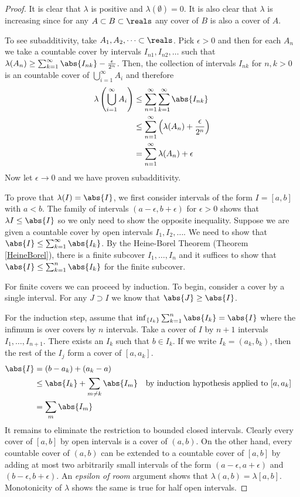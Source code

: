 \begin{proof}It is clear that $\lambda$ is positive and $\lambda(\emptyset) = 0$.  It is also
  clear that $\lambda$ is increasing since for any $A \subset B
  \subset \reals$ any cover of $B$ is also a cover of $A$.  

To see subadditivity, take $A_1, A_2, \dots \subset \reals$.  Pick
$\epsilon > 0$ and then for each $A_n$ we take a countable cover by intervals
$I_{n1}, I_{n2}, \dots$ such that $\lambda(A_n) \geq \sum_{k=1}^\infty
\abs{I_{nk}} - \frac{\epsilon}{2^n}$.  Then, the collection of
intervals $I_{nk}$ for $n,k > 0$ is an countable cover of
$\bigcup_{i=1}^\infty A_i$ and therefore
\begin{align*}
\lambda \left (\bigcup_{i=1}^\infty A_i \right ) &\leq
\sum_{n=1}^\infty \sum_{k=1}^\infty \abs{I_{nk}} \\
&\leq \sum_{n=1}^\infty \left ( \lambda(A_n) + \frac{\epsilon}{2^n}
\right )\\
&= \sum_{n=1}^\infty \lambda(A_n) + \epsilon
\end{align*}
Now let $\epsilon \to 0$ and we have proven subadditivity.

To prove that $\lambda(I) = \abs{I}$, we first consider intervals of
the form $I = [a,b]$ with $a < b$.  The family of intervals $(a -
\epsilon, b+\epsilon)$ for $\epsilon > 0$ shows that $\lambda{I} \leq
\abs{I}$ so we only need to show the opposite inequality.
Suppose we are given a countable cover by open intervals $I_1, I_2,
\dots$.  We need to show that $\abs{I} \leq \sum_{k=1}^\infty \abs{I_k}$.
By the Heine-Borel Theorem (Theorem \ref{HeineBorel}), there
is a finite subcover $I_1, \dots, I_n$ and it suffices to show
that $\abs{I} \leq \sum_{k=1}^n \abs{I_k}$ for the finite subcover.

For finite covers we
can proceed by induction.  To begin, consider a cover by a single
interval.  For any $J \supset I$ we know that
$\abs{J} \geq \abs{I}$.

For the induction step, assume that $\inf_{\{I_k\}} \sum_{k=1}^n
\abs{I_k} = \abs{I}$ where the infimum is over covers by $n$
intervals.  Take a cover of $I$ by $n+1$ intervals $I_1, \dots,
I_{n+1}$.  There exists an $I_k$ such that $b \in I_k$.  If we write
$I_k = (a_k,b_k)$, then the rest of the $I_j$ form a cover of
$[a,a_k]$.
\begin{align*}
\abs{I} &= (b-a_k) + (a_k - a) \\
&\leq \abs{I_k} + \sum_{m \neq k} \abs{I_m} & &\text{by induction
  hypothesis applied to $[a,a_k]$} \\
&=\sum_m \abs{I_m}
\end{align*}
It remains to eliminate the restriction to bounded closed intervals.
Clearly every cover of 
$[a,b]$ by open intervals is a cover of $(a,b)$.  On the other hand, every countable cover of $(a,b)$ can be extended to a countable cover of $[a,b]$ by adding
at most two arbitrarily small intervals of the form
$(a-\epsilon,a+\epsilon)$ and $(b-\epsilon,b+\epsilon)$.  An
\emph{epsilon of room} argument shows that $\lambda (a,b) = \lambda
[a,b]$.  Monotonicity of $\lambda$ shows the same is true for half
open intervals.



\end{proof}
